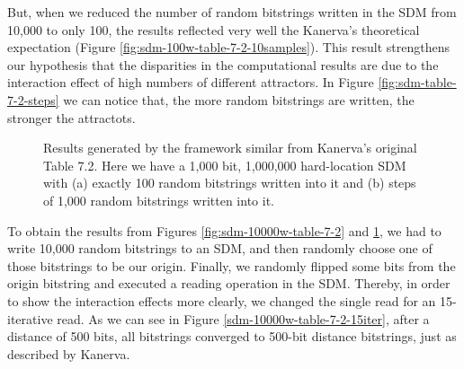 But, when we reduced the number of random bitstrings written in the SDM from 10,000 to only 100, the results reflected very well the Kanerva's theoretical expectation (Figure \ref{fig:sdm-100w-table-7-2-10samples}). This result strengthens our hypothesis that the disparities in the computational results are due to the interaction effect of high numbers of different attractors. In Figure \ref{fig:sdm-table-7-2-steps} we can notice that, the more random bitstrings are written, the stronger the attractots.

\begin{figure}[h]
\centering
{}

\caption{Results generated by the framework similar from Kanerva's original Table 7.2. Here we have a 1,000 bit, 1,000,000 hard-location SDM with (a) exactly 100 random bitstrings written into it and (b) steps of 1,000 random bitstrings written into it.
\label{fig:sdm-100w-table-7-2}}
\end{figure}

To obtain the results from Figures \ref{fig:sdm-10000w-table-7-2} and \ref{fig:sdm-100w-table-7-2}, we had to write 10,000 random bitstrings to an SDM, and then randomly choose one of those bitstrings to be our origin. Finally, we randomly flipped some bits from the origin bitstring and executed a reading operation in the SDM. Thereby, in order to show the interaction effects more clearly, we changed the single read for an 15-iterative read. As we can see in Figure \ref{sdm-10000w-table-7-2-15iter}, after a distance of 500 bits, all bitstrings converged to 500-bit distance bitstrings, just as described by Kanerva.

